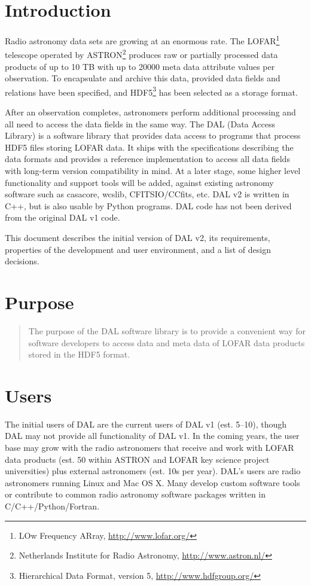 \documentclass[a4paper,11pt]{article}
\begin{document}
\maketitle

\tableofcontents

\section{Introduction} \label{sec:intro}
Radio astronomy data sets are growing at an enormous rate. 
The LOFAR\footnote{LOw Frequency ARray, \url{http://www.lofar.org/}} telescope operated by ASTRON\footnote{Netherlands Institute for Radio Astronomy, \url{http://www.astron.nl/}} produces raw or partially processed data products of up to 10 TB with up to 20000 meta data attribute values per observation.
To encapsulate and archive this data, provided data fields and relations have been specified, and HDF5\footnote{Hierarchical Data Format, version 5, \url{http://www.hdfgroup.org/}} has been selected as a storage format.

After an observation completes, astronomers perform additional processing and all need to access the data fields in the same way.
The DAL (Data Access Library) is a software library that provides data access to programs that process HDF5 files storing LOFAR data.
It ships with the specifications describing the data formats and provides a reference implementation to access all data fields with long-term version compatibility in mind.
At a later stage, some higher level functionality and support tools will be added, against existing astronomy software such as casacore, wcslib, CFITSIO/CCfits, etc.
DAL v2 is written in C++, but is also usable by Python programs. DAL code has not been derived from the original DAL v1 code.

This document describes the initial version of DAL v2, its requirements, properties of the development and user environment, and a list of design decisions.


\section{Purpose} \label{sec:purpose}
\begin{quote}
The purpose of the DAL software library is to provide a convenient way for software developers to access data and meta data of LOFAR data products stored in the HDF5 format.
\end{quote}


\section{Users} \label{sec:users}
The initial users of DAL are the current users of DAL v1 (est. 5--10), though DAL may not provide all functionality of DAL v1.
In the coming years, the user base may grow with the radio astronomers that receive and work with LOFAR data products (est. 50 within ASTRON and LOFAR key science project universities) plus external astronomers (est. 10s per year).
DAL's users are radio astronomers running Linux and Mac OS X.
Many develop custom software tools or contribute to common radio astronomy software packages written in C/C++/Python/Fortran.
\end{document}
